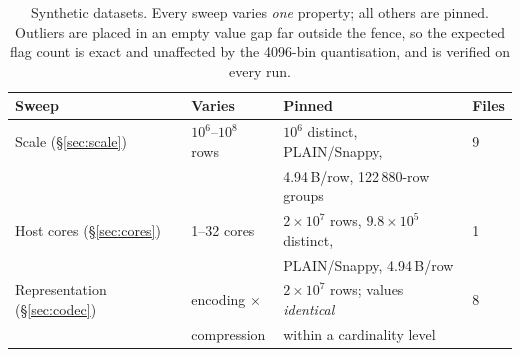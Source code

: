 \begin{table}[t]
\centering\small
\caption{Synthetic datasets. Every sweep varies \emph{one} property; all others are pinned.
Outliers are placed in an empty value gap far outside the fence, so the expected flag count is
exact and unaffected by the 4096-bin quantisation, and is verified on every run.}
\label{tab:datasets}
\begin{tabular}{@{}llll@{}}
\toprule
Sweep & Varies & Pinned & Files \\
\midrule
Scale (\S\ref{sec:scale}) & $10^6$--$10^8$ rows & $10^6$ distinct, PLAIN/Snappy, & 9 \\
                          &                     & 4.94\,B/row, 122\,880-row groups & \\
Host cores (\S\ref{sec:cores}) & 1--32 cores & $2\times10^7$ rows, $9.8\times10^5$ distinct, & 1 \\
                          &                     & PLAIN/Snappy, 4.94\,B/row & \\
Representation (\S\ref{sec:codec}) & encoding $\times$ & $2\times10^7$ rows; values \emph{identical} & 8 \\
                          & compression         & within a cardinality level & \\
\bottomrule
\end{tabular}
\end{table}
